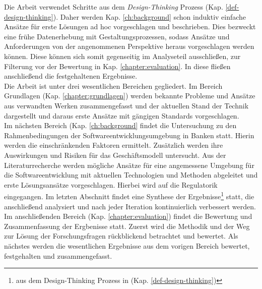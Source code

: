 Die Arbeit verwendet Schritte aus dem \emph{Design-Thinking} Prozess (Kap. \ref{def-design-thinking}). Daher werden Kap. \ref{ch:background} schon induktiv einfache Ansätze für erste Lösungen ad hoc vorgeschlagen und beschrieben. Dies bezweckt eine frühe Datenerhebung mit Gestaltungsprozessen, sodass Ansätze und Anforderungen von der angenommenen Perspektive heraus vorgeschlagen werden können. Diese können sich somit gegenseitig im Analyseteil ausschließen, zur Filterung vor der Bewertung in Kap. \ref{chapter:evaluation}. In diese fließen anschließend die festgehaltenen Ergebnisse.
\bigskip
\\
Die Arbeit ist unter drei wesentlichen Bereichen gegliedert. 
Im Bereich Grundlagen (Kap. \ref{chapter:grundlagen}) werden bekannte Probleme und Ansätze aus verwandten Werken zusammengefasst und der aktuellen Stand der Technik dargestellt und daraus erste Ansätze mit gängigen Standards vorgeschlagen. 
\medskip
\\
Im nächsten Bereich (Kap. \ref{ch:background} findet die Untersuchung zu den Rahmenbedingungen der Softwareentwicklungsumgebung in Banken statt. Hierin werden die einschränkenden Faktoren ermittelt. Zusätzlich werden ihre Auswirkungen und Risiken für das Geschäftsmodell untersucht. Aus der Literaturrecherche werden mögliche Ansätze für eine angemessene Umgebung für die Softwareentwicklung mit aktuellen Technologien und Methoden abgeleitet und erste Lösungsansätze vorgeschlagen. Hierbei wird auf die Regulatorik eingegangen. Im letzten Abschnitt findet eine Synthese der Ergebnisse\footnote{aus dem Design-Thinking Prozess in (Kap. \ref{def-design-thinking})} statt, die anschließend analysiert und nach jeder Iteration kontinuierlich verbessert werden.
\medskip
\\
Im anschließenden Bereich (Kap. \ref{chapter:evaluation}) findet die Bewertung und Zusammenfassung der Ergbenisse statt. Zuerst wird die Methodik und der Weg zur Lösung der Forschungsfragen rückblickend betrachtet und bewertet. Als nächstes werden die wesentlichen Ergebnisse aus dem vorigen Bereich bewertet, festgehalten und zusammengefasst.
